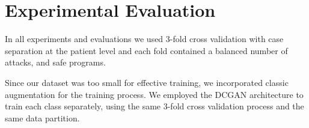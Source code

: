 \section{Experimental Evaluation}\label{results}


In all experiments and evaluations we used 3-fold cross validation with case separation at
the patient level and each fold contained a balanced number
of attacks, and safe programs.

Since
our dataset was too small for effective training, we incorporated classic augmentation for the training process. We employed the DCGAN architecture to train each  class separately, using the same 3-fold cross validation process and the
same data partition. 